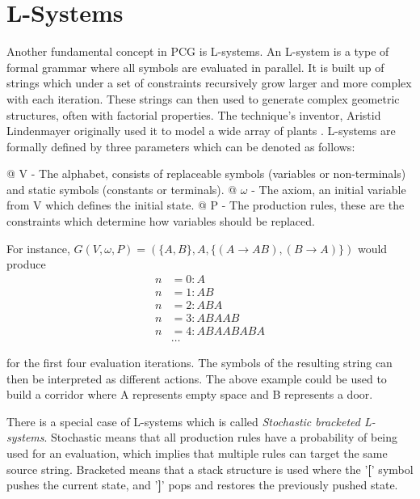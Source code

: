 \section{L-Systems}
\label{chap:lsystem}

Another fundamental concept in PCG is L-systems.
An L-system is a type of formal grammar where all symbols are evaluated in parallel.
It is built up of strings which under a set of constraints recursively grow larger and more complex with each iteration.
These strings can then used to generate complex geometric structures, often with factorial properties.
The technique's inventor, Aristid Lindenmayer originally used it to model a wide array of plants \cite{lsystem_book}.
L-systems are formally defined by three parameters which can be denoted as follows:

\begin{easylist}
  @ V  - The alphabet, consists of replaceable symbols (variables or non-terminals) and static symbols (constants or terminals).
  @ $\omega$ - The axiom, an initial variable from V which defines the initial state.
  @ P - The production rules, these are the constraints which determine how variables should be replaced.
\end{easylist}

For instance, $G(V, \omega, P) = (\{A, B\}, A, \{(A \to AB), (B \to A)\})$ would produce
\begin{align*}
  n &= 0: A \\
  n &= 1: AB \\
  n &= 2: ABA \\
  n &= 3: ABAAB \\
  n &= 4: ABAABABA \\
  &\dots
\end{align*}
\vspace{-1.0cm}

for the first four evaluation iterations. The symbols of the resulting string can then be interpreted as different actions.
The above example could be used to build a corridor where A represents empty space and B represents a door.

There is a special case of L-systems which is called \textit{Stochastic bracketed L-systems}.
Stochastic means that all production rules have a probability of being used for an evaluation, which implies that multiple rules can target the same source string.
Bracketed means that a stack structure is used where the '\textbf{[}' symbol pushes the current state, and '\textbf{]}' pops and restores the previously pushed state.

